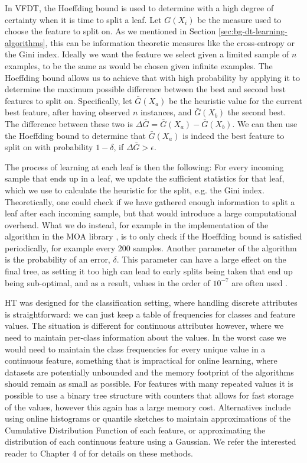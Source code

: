 In VFDT, the Hoeffding bound is used to determine with a high degree of certainty when
it is time to split a leaf. Let $G(X_i)$ be the measure used to choose the feature
to split on. As we mentioned in Section \ref{sec:bg-dt-learning-algorithms}, this can be
information theoretic measures like the cross-entropy or the Gini index. Ideally we want the feature we select given a limited sample of $n$ examples, to be the same as would be chosen given infinite examples.
The Hoeffding bound allows us to achieve that with high probability by applying
it to determine the maximum possible difference between the best and second best
features to split on. Specifically, let $\bar{G}(X_a)$ be the heuristic value for the
current best feature, after having observed $n$ instances, and $\bar{G}(X_b)$ the second
best. The difference between these two is $\Delta \bar{G} = \bar{G}(X_a) - \bar{G}(X_b)$.
We can then use the Hoeffding bound to determine that $\bar{G}(X_a)$ is indeed the
best feature to split on with probability $1-\delta$, if $\Delta \bar{G} > \epsilon$.

The process of learning at each leaf is then the following: For every incoming sample
that ends up in a leaf, we update the sufficient statistics for that leaf, which we
use to calculate the heuristic for the split, e.g. the Gini index. Theoretically,
one could check if we have gathered enough information to split a leaf after each
incoming sample, but that would introduce a large computational overhead. What we
do instead, for example in the implementation of the algorithm in the MOA library \cite{bifet2010moa},
is to only check if the Hoeffding bound is satisfied periodically, for example
every 200 samples. Another parameter of the algorithm is the probability of an error,
$\delta$. This parameter can have a large effect on the final tree, as setting it
too high can lead to early splits being taken that end up being sub-optimal, and as a result,
values in the order of $10^{-7}$ are often used \cite{data-stream-mining}.

HT was designed for the classification setting, where handling discrete attributes
is straightforward: we can just keep a table of frequencies for classes and feature
values. The situation
is different for continuous attributes however, where we need to maintain per-class
information about the values. In the worst case we would need to maintain the class
frequencies for every unique value in a continuous feature, something that is impractical
for online learning, where datasets are potentially unbounded and the memory footprint
of the algorithms should remain as small as possible. For features with many repeated
values it is possible to use a binary tree structure with counters that allows for
fast storage of the values, however this again has a large memory cost. Alternatives include
using online histograms or quantile sketches \cite{greenwald2016quantiles}
to maintain approximations of the Cumulative Distribution Function of
each feature, or approximating the distribution of each continuous feature using a Gaussian.
We refer the interested reader to Chapter 4 of \citet{data-stream-mining} for details on these methods.

